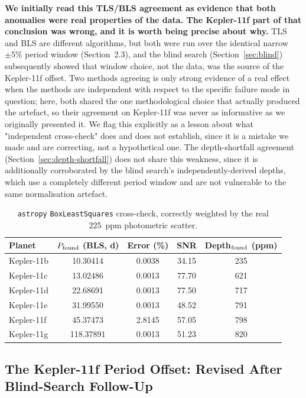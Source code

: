 \documentclass[11pt]{article}
\begin{document}
\textbf{We initially read this TLS/BLS agreement as evidence that both anomalies were real properties of the data. The Kepler-11f part of that conclusion was wrong, and it is worth being precise about why.} TLS and BLS are different algorithms, but both were run over the identical narrow $\pm5\%$ period window (Section~2.3), and the blind search (Section~\ref{sec:blind}) subsequently showed that window choice, not the data, was the source of the Kepler-11f offset. Two methods agreeing is only strong evidence of a real effect when the methods are independent with respect to the specific failure mode in question; here, both shared the one methodological choice that actually produced the artefact, so their agreement on Kepler-11f was never as informative as we originally presented it. We flag this explicitly as a lesson about what "independent cross-check" does and does not establish, since it is a mistake we made and are correcting, not a hypothetical one. The depth-shortfall agreement (Section~\ref{sec:depth-shortfall}) does not share this weakness, since it is additionally corroborated by the blind search's independently-derived depths, which use a completely different period window and are not vulnerable to the same normalisation artefact.

\begin{table}[h]
\centering
\caption{\texttt{astropy} \texttt{BoxLeastSquares} cross-check, correctly weighted by the real 225~ppm photometric scatter.}
\label{tab:bls}
\begin{tabular}{lcccc}
\toprule
Planet & $P_{\rm found}$ (BLS, d) & Error (\%) & SNR & Depth$_{\rm found}$ (ppm) \\
\midrule
Kepler-11b & 10.30414 & 0.0038 & 34.15 & 235 \\
Kepler-11c & 13.02486 & 0.0013 & 77.70 & 621 \\
Kepler-11d & 22.68691 & 0.0013 & 77.50 & 717 \\
Kepler-11e & 31.99550 & 0.0013 & 48.52 & 791 \\
Kepler-11f & 45.37473 & 2.8145 & 57.05 & 798 \\
Kepler-11g & 118.37891 & 0.0013 & 51.23 & 820 \\
\bottomrule
\end{tabular}
\end{table}

\subsection{The Kepler-11f Period Offset: Revised After Blind-Search Follow-Up}
\label{sec:ttv}
\end{document}
